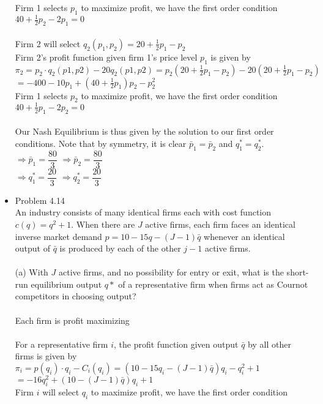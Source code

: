 \documentclass{article}
\begin{document}
\begin{itemize}
    Firm 1 selects $p_1$ to maximize profit, we have the first order condition\\
    $40+\frac{1}{2}p_2-2p_1=0$\\\\
    Firm 2 will select $q_2(p_1,p_2)=20+\frac{1}{2}p_1-p_2$\\
    Firm 2's profit function given firm 1's price level $p_1$ is given by\\
    $\pi_2=p_2\cdot q_2(p1,p2)-20q_2(p1,p2)=p_2(20+\frac{1}{2}p_1-p_2)-20(20+\frac{1}{2}p_1-p_2)$\\
    $=-400-10p_1+(40+\frac{1}{2}p_1)p_2-p_2^2$\\
    Firm 1 selects $p_2$ to maximize profit, we have the first order condition\\
    $40+\frac{1}{2}p_1-2p_2=0$\\\\
    Our Nash Equilibrium is thus given by the solution to our first order conditions.  Note that by symmetry, it is clear $\bar{p}_1=\bar{p}_2$ and $q_1^*=q_2^*$.\\
    $\Rightarrow \bar{p}_1=\dfrac{80}{3}$ $\Rightarrow \bar{p}_2=\dfrac{80}{3}$\\
    $\Rightarrow q_1^*=\dfrac{20}{3}$ $\Rightarrow q_2^*=\dfrac{20}{3}$
    \pagebreak
    \item Problem 4.14\\
    An industry consists of many identical firms each with cost function $c(q)=q^2+1$.  When there are $J$ active firms, each firm faces an identical inverse market demand $p=10-15q-(J-1)\bar{q}$ whenever an identical output of $\bar{q}$ is produced by each of the other $j-1$ active firms.\\\\
    (a) With $J$ active firms, and no possibility for entry or exit, what is the short-run equilibrium output $q*$ of a representative firm when firms act as Cournot competitors in choosing output?\\\\
    Each firm is profit maximizing\\\\
    For a representative firm $i$, the profit function given output $\bar{q}$ by all other firms is given by\\
    $\pi_i=p(q_i)\cdot q_i-C_i(q_i)=(10-15q_i-(J-1)\bar{q})q_i-q_i^2+1$\\
    $=-16q_i^2+(10-(J-1)\bar{q})q_i+1$\\
    Firm $i$ will select $q_i$ to maximize profit, we have the first order condition\\

\end{itemize}
\end{document}
